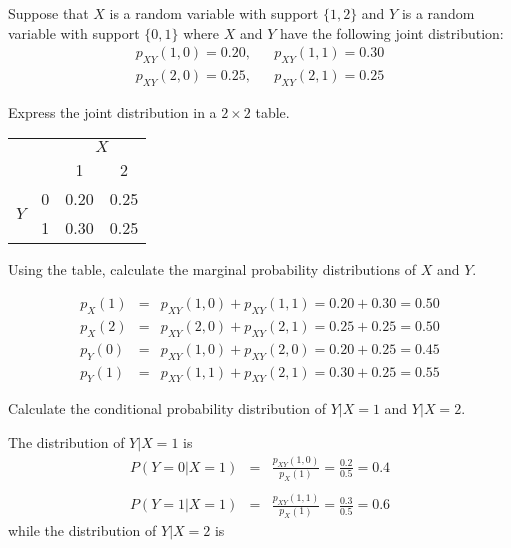 \documentclass[addpoints,12pt]{exam}
\begin{document}
\begin{questions}
\question Suppose that $X$ is a random variable with support $\{1,2\}$ and $Y$ is a random variable with support $\{0,1\}$ where $X$ and $Y$ have the following joint distribution:
			\begin{eqnarray*}
				p_{XY}(1,0) = 0.20, && p_{XY}(1,1) = 0.30 \\
				p_{XY}(2,0) = 0.25, && p_{XY}(2,1) = 0.25
			\end{eqnarray*}
	\begin{parts}
		\item Express the joint distribution in a $2\times 2$ table.
			\begin{solution}
			\begin{center}
\begin{tabular}{|cc|cc|}
\hline
&&\multicolumn{2}{c|}{$X$}\\
&&1 & 2\\
\hline
\multirow{2}{*}{$Y$}
&0& \multicolumn{1}{|c}{0.20} & 0.25\\
&1& \multicolumn{1}{|c}{0.30} & 0.25\\
\hline
\end{tabular}
\end{center}
			\end{solution}
		\item Using the table, calculate the marginal probability distributions of $X$ and $Y$.
			\begin{solution}
				\begin{eqnarray*}
					p_X(1) &=&p_{XY}(1,0) + p_{XY}(1,1)=0.20+0.30 = 0.50 \\
					p_X(2) &=&p_{XY}(2,0) + p_{XY}(2,1)=0.25 + 0.25 = 0.50 \\
					p_Y(0) &=&p_{XY}(1,0) + p_{XY}(2,0) = 0.20 + 0.25 = 0.45 \\
					p_Y(1) &=& p_{XY}(1,1) + p_{XY}(2,1) = 0.30 + 0.25 = 0.55
				\end{eqnarray*}
			\end{solution}
		\item Calculate the conditional probability distribution of $Y|X=1$ and $Y|X=2$.
			\begin{solution}
			The distribution of $Y|X = 1$ is
				\begin{eqnarray*}
					P(Y = 0|X = 1) &=&\frac{p_{XY}(1,0)}{p_X(1)} = \frac{0.2}{0.5}=0.4\\\\
					P(Y = 1|X= 1) &=&\frac{p_{XY}(1,1)}{p_X(1)} = \frac{0.3}{0.5} = 0.6
				\end{eqnarray*}
				while the distribution of $Y|X = 2$ is

\end{solution}
\end{parts}
\end{questions}
\end{document}
